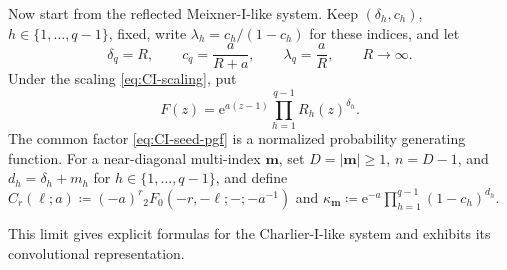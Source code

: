 \documentclass[10pt]{amsart}
\newcommand{\e}{\mathrm e}
\newcommand{\mm}{\boldsymbol m}
\newcommand{\abs}[1]{\lvert#1\rvert}
\theoremstyle{plain}
\theoremstyle{definition}
\theoremstyle{remark}
\begin{document}
Now start from the reflected Meixner-I-like system. Keep
\((\delta_h,c_h)\), \(h\in\{1,\ldots,q-1\}\), fixed, write
\(\lambda_h=c_h/(1-c_h)\) for these indices, and let
\begin{equation}
 \delta_q=R,\qquad c_q=\frac{a}{R+a},
 \qquad \lambda_q=\frac aR,\qquad R\to\infty.
 \label{eq:CI-scaling}
\end{equation}
Under the scaling \eqref{eq:CI-scaling}, put
\begin{equation}
 F(z)=\e^{a(z-1)}\prod_{h=1}^{q-1}R_h(z)^{\delta_h}.
 \label{eq:CI-seed-pgf}
\end{equation}
The common factor \eqref{eq:CI-seed-pgf} is a normalized probability
generating function.
For a near-diagonal multi-index \(\mm\), set
\(D=\abs\mm\ge1\), \(n=D-1\), and
\(d_h=\delta_h+m_h\) for \(h\in\{1,\ldots,q-1\}\), and define
\(\widehat C_r(\ell;a)\coloneq(-a)^r{}_2F_0(-r,-\ell;-;-a^{-1})\)
and \(\kappa_{\mm}\coloneq\e^{-a}\prod_{h=1}^{q-1}(1-c_h)^{d_h}\).

This limit gives explicit formulas for the Charlier-I-like system and
exhibits its convolutional representation.
\end{document}
